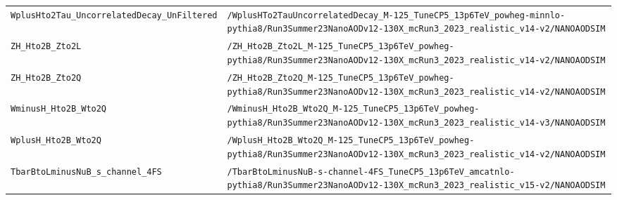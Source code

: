\begin{longtable}{@{}>{\RaggedRight\arraybackslash}p{} >{\RaggedRight\arraybackslash}p{}@{}}
\addlinespace[2pt]
\texttt{WplusHto2Tau\_\allowbreak{}UncorrelatedDecay\_\allowbreak{}UnFiltered} & \texttt{/\allowbreak{}WplusHTo2TauUncorrelatedDecay\_\allowbreak{}M-\allowbreak{}125\_\allowbreak{}TuneCP5\_\allowbreak{}13p6TeV\_\allowbreak{}powheg-\allowbreak{}minnlo-\allowbreak{}pythia8/\allowbreak{}Run3Summer23NanoAODv12-\allowbreak{}130X\_\allowbreak{}mcRun3\_\allowbreak{}2023\_\allowbreak{}realistic\_\allowbreak{}v14-\allowbreak{}v2/\allowbreak{}NANOAODSIM} \\
\addlinespace[2pt]
\texttt{ZH\_\allowbreak{}Hto2B\_\allowbreak{}Zto2L} & \texttt{/\allowbreak{}ZH\_\allowbreak{}Hto2B\_\allowbreak{}Zto2L\_\allowbreak{}M-\allowbreak{}125\_\allowbreak{}TuneCP5\_\allowbreak{}13p6TeV\_\allowbreak{}powheg-\allowbreak{}pythia8/\allowbreak{}Run3Summer23NanoAODv12-\allowbreak{}130X\_\allowbreak{}mcRun3\_\allowbreak{}2023\_\allowbreak{}realistic\_\allowbreak{}v14-\allowbreak{}v2/\allowbreak{}NANOAODSIM} \\
\addlinespace[2pt]
\texttt{ZH\_\allowbreak{}Hto2B\_\allowbreak{}Zto2Q} & \texttt{/\allowbreak{}ZH\_\allowbreak{}Hto2B\_\allowbreak{}Zto2Q\_\allowbreak{}M-\allowbreak{}125\_\allowbreak{}TuneCP5\_\allowbreak{}13p6TeV\_\allowbreak{}powheg-\allowbreak{}pythia8/\allowbreak{}Run3Summer23NanoAODv12-\allowbreak{}130X\_\allowbreak{}mcRun3\_\allowbreak{}2023\_\allowbreak{}realistic\_\allowbreak{}v14-\allowbreak{}v2/\allowbreak{}NANOAODSIM} \\
\addlinespace[2pt]
\texttt{WminusH\_\allowbreak{}Hto2B\_\allowbreak{}Wto2Q} & \texttt{/\allowbreak{}WminusH\_\allowbreak{}Hto2B\_\allowbreak{}Wto2Q\_\allowbreak{}M-\allowbreak{}125\_\allowbreak{}TuneCP5\_\allowbreak{}13p6TeV\_\allowbreak{}powheg-\allowbreak{}pythia8/\allowbreak{}Run3Summer23NanoAODv12-\allowbreak{}130X\_\allowbreak{}mcRun3\_\allowbreak{}2023\_\allowbreak{}realistic\_\allowbreak{}v14-\allowbreak{}v3/\allowbreak{}NANOAODSIM} \\
\addlinespace[2pt]
\texttt{WplusH\_\allowbreak{}Hto2B\_\allowbreak{}Wto2Q} & \texttt{/\allowbreak{}WplusH\_\allowbreak{}Hto2B\_\allowbreak{}Wto2Q\_\allowbreak{}M-\allowbreak{}125\_\allowbreak{}TuneCP5\_\allowbreak{}13p6TeV\_\allowbreak{}powheg-\allowbreak{}pythia8/\allowbreak{}Run3Summer23NanoAODv12-\allowbreak{}130X\_\allowbreak{}mcRun3\_\allowbreak{}2023\_\allowbreak{}realistic\_\allowbreak{}v14-\allowbreak{}v2/\allowbreak{}NANOAODSIM} \\
\addlinespace[2pt]
\texttt{TbarBtoLminusNuB\_\allowbreak{}s\_\allowbreak{}channel\_\allowbreak{}4FS} & \texttt{/\allowbreak{}TbarBtoLminusNuB-\allowbreak{}s-\allowbreak{}channel-\allowbreak{}4FS\_\allowbreak{}TuneCP5\_\allowbreak{}13p6TeV\_\allowbreak{}amcatnlo-\allowbreak{}pythia8/\allowbreak{}Run3Summer23NanoAODv12-\allowbreak{}130X\_\allowbreak{}mcRun3\_\allowbreak{}2023\_\allowbreak{}realistic\_\allowbreak{}v15-\allowbreak{}v2/\allowbreak{}NANOAODSIM} \\

\end{longtable}
